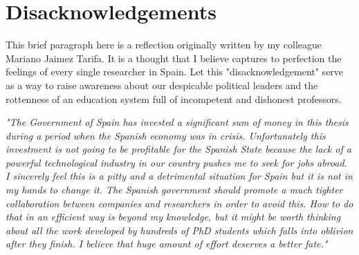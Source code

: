 \chapter{Disacknowledgements}

This brief paragraph here is a reflection originally written by my colleague Mariano Jaimez Tarifa. It is a thought that I believe captures to perfection the feelings of every single researcher in Spain. Let this "disacknowledgement" serve as a way to raise awareness about our despicable political leaders and the rottenness of an education system full of incompetent and dishonest professors.

\emph{"The Government of Spain has invested a significant sum of money in this thesis during a period when the Spanish economy was in crisis. Unfortunately this investment is not going to be profitable for the Spanish State because the lack of a powerful technological industry in our country pushes me to seek for jobs abroad. I sincerely feel this is a pitty and a detrimental situation for Spain but it is not in my hands to change it. The Spanish government should promote a much tighter collaboration between companies and researchers in order to avoid this. How to do that in an efficient way is beyond my knowledge, but it might be worth thinking about all the work developed by hundreds of PhD students which falls into oblivion after they finish. I believe that huge amount of effort deserves a better fate."}


